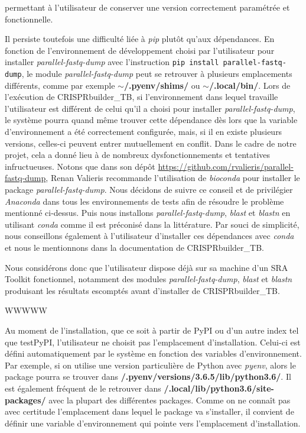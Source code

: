 \documentclass[twoside,a4paper,11pt,frenchb,openany]{report}
\begin{document}
permettant à l'utilisateur de conserver une version correctement paramétrée et fonctionnelle.

Il persiste toutefois une difficulté liée à \textit{pip} plutôt qu'aux dépendances. En fonction de l'environnement de développement choisi par l'utilisateur pour installer \textit{parallel-fastq-dump} avec l'instruction \texttt{pip install parallel-fastq-dump}, le module \textit{parallel-fastq-dump} peut se retrouver à plusieurs emplacements différents, comme par exemple \textbf{$\sim$/.pyenv/shims/} ou \textbf{$\sim$/.local/bin/}. Lors de l'exécution de CRISPRbuilder\_TB, si l'environnement dans lequel travaille l'utilisateur est différent de celui qu'il a choisi pour installer \textit{parallel-fastq-dump}, le système pourra quand même trouver cette dépendance dès lors que la variable d'environnement a été correctement configurée, mais, si il en existe plusieurs versions, celles-ci peuvent entrer mutuellement en conflit. Dans le cadre de notre projet, cela a donné lieu à de nombreux dysfonctionnements et tentatives infructueuses. Notons que dans son dépôt \url{https://github.com/rvalieris/parallel-fastq-dump}, Renan Valieris recommande l'utilisation de \textit{bioconda} pour installer le package \textit{parallel-fastq-dump}. Nous décidons de suivre ce conseil et de privilégier \textit{Anaconda} dans tous les environnements de tests afin de résoudre le problème mentionné ci-dessus. Puis nous installons \textit{parallel-fastq-dump}, \textit{blast} et \textit{blastn} en utilisant \textit{conda} comme il est préconisé dans la littérature. Par souci de simplicité, nous conseillons également à l'utilisateur d'installer ces dépendances avec \textit{conda} et nous le mentionnons dans la documentation de CRISPRbuilder\_TB.


Nous considérons donc que l'utilisateur dispose déjà sur sa machine d'un SRA Toolkit fonctionnel, notamment des modules \textit{parallel-fastq-dump}, \textit{blast} et \textit{blastn} produisant les résultats escomptés avant d'installer de CRISPRbuilder\_TB.


WWWWW

Au moment de l'installation, que ce soit à partir de PyPI ou d'un autre index tel que
testPyPI, l'utilisateur ne choisit pas l'emplacement d'installation. Celui-ci est défini automatiquement par le système en fonction des variables d'environnement. Par exemple, si on utilise une version particulière de Python avec \textit{pyenv}, alors le package pourra se trouver dans \textbf{\raisebox{-1ex}{\textasciitilde}/.pyenv/versions/3.6.5/lib/python3.6/}. Il est également fréquent de le retrouver dans \textbf{\raisebox{-1ex}{\textasciitilde}/.local/lib/python3.6/site-packages/} avec la plupart des différentes packages. Comme on ne connaît pas avec certitude l'emplacement dans lequel le package va s'installer, il convient de définir une variable d'environnement qui pointe vers l'emplacement d'installation.
\end{document}
